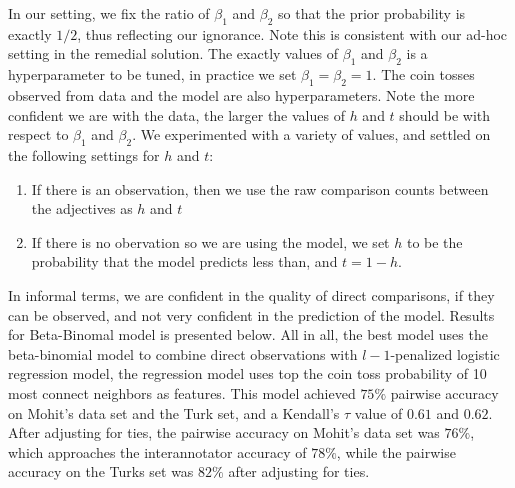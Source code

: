 In our setting, we fix the ratio of $\beta_1$ and $\beta_2$ so that the prior probability is exactly $1/2$, thus reflecting our ignorance. Note this is consistent with our ad-hoc setting in the remedial solution. The exactly values of $\beta_1$ and $\beta_2$ is a hyperparameter to be tuned, in practice we set $\beta_1 = \beta_2 = 1$. The coin tosses observed from data and the model are also hyperparameters. Note the more confident we are with the data, the larger the values of $h$ and $t$ should be with respect to $\beta_1$ and $\beta_2$. We experimented with a variety of values, and settled on the following settings for $h$ and $t$:
	\begin{enumerate}
		\item If there is an observation, then we use the raw comparison counts between the adjectives as $h$ and $t$
		\item If there is no obervation so we are using the model, we set $h$ to be the probability that the model predicts less than, and $t = 1 - h$.
	\end{enumerate}

In informal terms, we are confident in the quality of direct comparisons, if they can be observed, and not very confident in the prediction of the model. Results for Beta-Binomal model is presented below.  All in all, the best model uses the beta-binomial model to combine direct observations with $l-1$-penalized logistic regression model, the regression model uses top the coin toss probability of 10 most connect neighbors as features. This model achieved $75\%$ pairwise accuracy on Mohit's data set and the Turk set, and a Kendall's $\tau$ value of $0.61$ and $0.62$. After adjusting for ties, the pairwise accuracy on Mohit's data set was $76\%$, which approaches the interannotator accuracy of $78\%$, while the pairwise accuracy on the Turks set was $82\%$ after adjusting for ties. 

